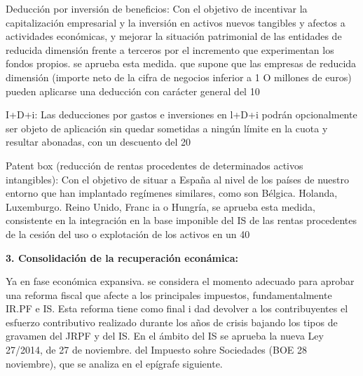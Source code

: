 \documentclass[10pt,a4paper]{article}
\begin{document}
Deducción por inversión de beneficios: Con el objetivo de incentivar la capitalización empresarial y la inversión en activos nuevos tangibles y afectos a actividades económicas, y mejorar la situación patrimonial de las entidades de reducida dimensión frente a terceros por el incremento que experimentan los fondos propios. se aprueba esta medida. que supone que las empresas de reducida dimensión (importe neto de la cifra de negocios inferior a 1 O millones de euros) pueden aplicarse una deducción con carácter general del 10%

I+D+i: Las deducciones por gastos e inversiones en l+D+i podrán opcionalmente ser objeto de aplicación sin quedar sometidas a ningún límite en la cuota y resultar abonadas, con un descuento del 20%

Patent box (reducción de rentas procedentes de determinados activos intangibles): Con el objetivo de situar a España al nivel de los países de nuestro entorno que han implantado regímenes similares, como son Bélgica. Holanda, Luxemburgo. Reino Unido, Franc ia o Hungría, se aprueba esta medida, consistente en la integración en la base imponible del IS de las rentas procedentes de la cesión del uso o explotación de los activos en un 40%

\textbf{3. Consolidación de la recuperación econámica:}

Ya en fase económica expansiva. se considera el momento adecuado para aprobar una reforma fiscal que afecte a los principales impuestos, fundamentalmente IR.PF e IS. Esta reforma tiene como final i dad devolver a los contribuyentes el esfuerzo contributivo realizado durante los años de crisis bajando los tipos de gravamen del JRPF y del IS. En el ámbito del IS se aprueba la nueva Ley 27/2014, de 27 de noviembre. del Impuesto sohre Sociedades (BOE 28 noviembre), que se analiza en el epígrafe siguiente.
\end{document}
